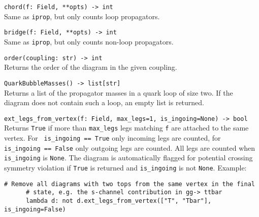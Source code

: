 \begin{basedescript}{\desclabelstyle{\pushlabel}}
   \item[\hspace{-1em}]\colorbox{gray!30}{\lstinline[style=pykw]|chord(f: Field, **opts) -> int|} \vspace{0.1cm}\\
   Same as \texttt{iprop}, but only counts loop propagators.

   \item[\hspace{-1em}]\colorbox{gray!30}{\lstinline[style=pykw]|bridge(f: Field, **opts) -> int|} \vspace{0.1cm}\\
   Same as \texttt{iprop}, but only counts non-loop propagators.

   \item[\hspace{-1em}]\colorbox{gray!30}{\lstinline[style=pykw]|order(coupling: str) -> int|} \vspace{0.1cm}\\
   Returns the order of the diagram in the given coupling.

   \item[\hspace{-1em}]\colorbox{gray!30}{\lstinline[style=pykw]|QuarkBubbleMasses() -> list[str]|} \vspace{0.1cm}\\
   Returns a list of the propagator masses in a quark loop of size two. If the diagram does not contain such a loop, an empty list is returned.  

   \item[\hspace{-1em}]\colorbox{gray!30}{\lstinline[style=pykw]{ext_legs_from_vertex(f: Field, max_legs=1, is_ingoing=None) -> bool}} \vspace{0.1cm}\\
   Returns \texttt{True} if more than \texttt{max\_legs} legs matching \texttt{f} are attached to the same vertex. For \lstinline[style=pykw]| is_ingoing == True| only incoming legs are counted, for \lstinline[style=pykw]| is_ingoing == False| only outgoing legs are counted. All legs are counted when \texttt{is\_ingoing} is \texttt{None}. The diagram is automatically flagged for potential crossing symmetry violation if \texttt{True} is returned and \texttt{is\_ingoing} is not \texttt{None}.
   Example:
   \begin{lstlisting}[style=pykw]
      # Remove all diagrams with two tops from the same vertex in the final 
      # state, e.g. the s-channel contribution in gg-> ttbar
      lambda d: not d.ext_legs_from_vertex(["T", "Tbar"], is_ingoing=False)
   \end{lstlisting}


\end{basedescript}
